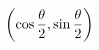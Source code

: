 \documentclass[preview]{standalone}
\begin{document}
\begin{align*}
\special{dvisvgm:raw <g id='unique000'>}\left(\cos\dfrac{\theta}{2},\sin\dfrac{\theta}{2}\right)\special{dvisvgm:raw </g>}
\end{align*}
\end{document}

